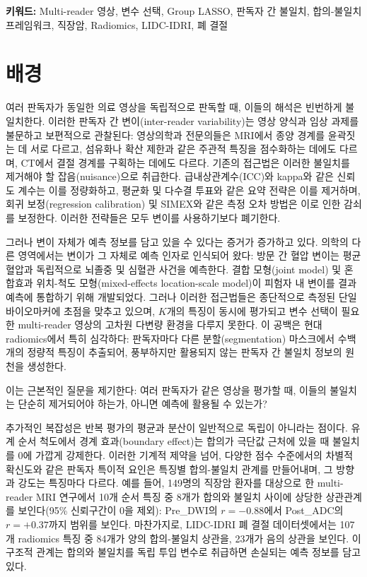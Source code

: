 \documentclass[a4paper,11pt]{article}
\begin{document}
\noindent\textbf{키워드:} Multi-reader 영상, 변수 선택, Group LASSO, 판독자 간 불일치, 합의-불일치 프레임워크, 직장암, Radiomics, LIDC-IDRI, 폐 결절

\section{배경}\label{sec:background}

여러 판독자가 동일한 의료 영상을 독립적으로 판독할 때, 이들의 해석은 빈번하게 불일치한다.
이러한 판독자 간 변이(inter-reader variability)는 영상 양식과 임상 과제를 불문하고 보편적으로 관찰된다: 영상의학과 전문의들은 MRI에서 종양 경계를 윤곽짓는 데 서로 다르고, 섬유화나 확산 제한과 같은 주관적 특징을 점수화하는 데에도 다르며, CT에서 결절 경계를 구획하는 데에도 다르다.
기존의 접근법은 이러한 불일치를 제거해야 할 잡음(nuisance)으로 취급한다.
급내상관계수(ICC)와 kappa와 같은 신뢰도 계수는 이를 정량화하고, 평균화 및 다수결 투표와 같은 요약 전략은 이를 제거하며, 회귀 보정(regression calibration) 및 SIMEX와 같은 측정 오차 방법은 이로 인한 감쇠를 보정한다.
이러한 전략들은 모두 변이를 사용하기보다 폐기한다.

그러나 변이 자체가 예측 정보를 담고 있을 수 있다는 증거가 증가하고 있다.
의학의 다른 영역에서는 변이가 그 자체로 예측 인자로 인식되어 왔다: 방문 간 혈압 변이는 평균 혈압과 독립적으로 뇌졸중 및 심혈관 사건을 예측한다.
결합 모형(joint model) 및 혼합효과 위치-척도 모형(mixed-effects location-scale model)이 피험자 내 변이를 결과 예측에 통합하기 위해 개발되었다.
그러나 이러한 접근법들은 종단적으로 측정된 단일 바이오마커에 초점을 맞추고 있으며, $K$개의 특징이 동시에 평가되고 변수 선택이 필요한 multi-reader 영상의 고차원 다변량 환경을 다루지 못한다.
이 공백은 현대 radiomics에서 특히 심각하다: 판독자마다 다른 분할(segmentation) 마스크에서 수백 개의 정량적 특징이 추출되어, 풍부하지만 활용되지 않는 판독자 간 불일치 정보의 원천을 생성한다.

이는 근본적인 질문을 제기한다: 여러 판독자가 같은 영상을 평가할 때, 이들의 불일치는 단순히 제거되어야 하는가, 아니면 예측에 활용될 수 있는가?

추가적인 복잡성은 반복 평가의 평균과 분산이 일반적으로 독립이 아니라는 점이다.
유계 순서 척도에서 경계 효과(boundary effect)는 합의가 극단값 근처에 있을 때 불일치를 0에 가깝게 강제한다.
이러한 기계적 제약을 넘어, 다양한 점수 수준에서의 차별적 확신도와 같은 판독자 특이적 요인은 특징별 합의-불일치 관계를 만들어내며, 그 방향과 강도는 특징마다 다르다.
예를 들어, 149명의 직장암 환자를 대상으로 한 multi-reader MRI 연구에서 10개 순서 특징 중 8개가 합의와 불일치 사이에 상당한 상관관계를 보인다(95\% 신뢰구간이 0을 제외): Pre\_DWI의 $r = -0.88$에서 Post\_ADC의 $r = +0.37$까지 범위를 보인다.
마찬가지로, LIDC-IDRI 폐 결절 데이터셋에서는 107개 radiomics 특징 중 84개가 양의 합의-불일치 상관을, 23개가 음의 상관을 보인다.
이 구조적 관계는 합의와 불일치를 독립 투입 변수로 취급하면 손실되는 예측 정보를 담고 있다.
\end{document}
